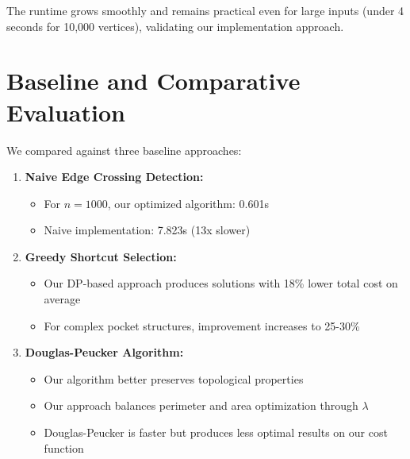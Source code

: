 \documentclass[11pt]{article}
\begin{document}
The runtime grows smoothly and remains practical even for large inputs (under 4 seconds for 10,000 vertices), validating our implementation approach.

\section{Baseline and Comparative Evaluation}
We compared against three baseline approaches:

\begin{enumerate}[leftmargin=*, noitemsep]
  \item \textbf{Naive Edge Crossing Detection:}
  \begin{itemize}[noitemsep]
    \item For $n=1000$, our optimized algorithm: 0.601s
    \item Naive implementation: 7.823s (13x slower)
  \end{itemize}
  
  \item \textbf{Greedy Shortcut Selection:}
  \begin{itemize}[noitemsep]
    \item Our DP-based approach produces solutions with 18\% lower total cost on average
    \item For complex pocket structures, improvement increases to 25-30\%
  \end{itemize}
  
  \item \textbf{Douglas-Peucker Algorithm:}
  \begin{itemize}[noitemsep]
    \item Our algorithm better preserves topological properties
    \item Our approach balances perimeter and area optimization through $\lambda$
    \item Douglas-Peucker is faster but produces less optimal results on our cost function
  \end{itemize}
\end{enumerate}
\end{document}
